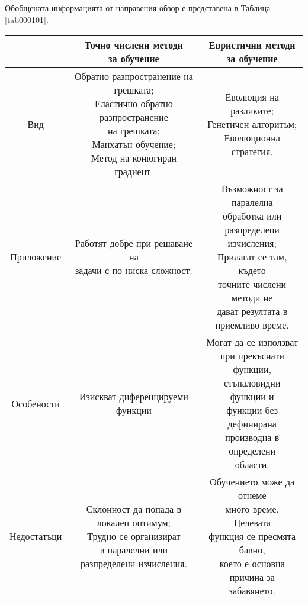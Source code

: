 Обобщената информацията от направения обзор е представена в Таблица \ref{tab000101}.

\begin{table}[h!]
    \begin{tabular}{ | c | c | c |}
      \hline
        & \thead{Точно числени методи\\ за обучение} & \thead{Евристични методи\\ за обучение} \\
      \hline
      \cellcolor{gray!15}
      Вид &  \thead{Обратно разпространение на грешката; \\ Еластично обратно разпространение\\ на грешката; \\ Манхатън обучение; \\ Метод на конюгиран градиент.}  & \thead{Еволюция на разликите; \\ Генетичен алгоритъм; \\ Еволюционна стратегия.}  \\
      \hline
      \cellcolor{gray!15}
      Приложение & \makecell{Работят добре при решаване на\\ задачи с по-ниска сложност.} & \makecell{Възможност за паралелна \\ обработка или\\ разпределени изчисления; \\ Прилагат се там, където\\ точните числени методи не\\ дават резултата в\\ приемливо време.}  \\
      \hline
      \cellcolor{gray!15}
      Особености &  \makecell{Изискват диференцируеми\\ функции}  & \makecell{Могат да се използват\\ при прекъснати функции,\\ стъпаловидни функции и\\ функции без дефинирана\\ производна в определени\\ области.}  \\
      \hline
      \cellcolor{gray!15}
      Недостатъци &  \makecell{Склонност да попада в\\ локален оптимум;\\ Трудно се организират\\ в паралелни или \\разпределени изчисления.}  & \makecell{Обучението може да отнеме\\ много  време. Целевата\\ функция се пресмята бавно,\\ което е основна причина за\\ забавянето.}  \\

\end{tabular}
\end{table}
